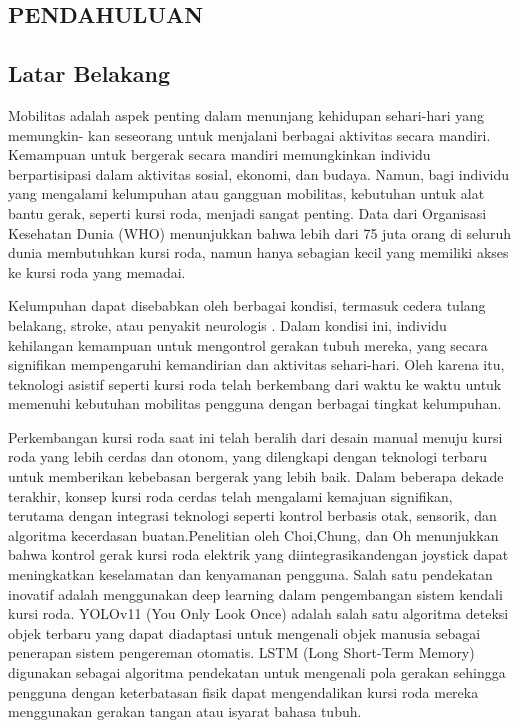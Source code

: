 
\begin{spacing}{1.2}
  \chapter{PENDAHULUAN}
\end{spacing}


\vspace{4ex}

\section{Latar Belakang}
Mobilitas adalah aspek penting dalam menunjang kehidupan sehari-hari yang memungkin-
kan seseorang untuk menjalani berbagai aktivitas secara mandiri. Kemampuan untuk bergerak secara mandiri memungkinkan individu berpartisipasi dalam aktivitas sosial, ekonomi, dan budaya. Namun, bagi individu yang mengalami kelumpuhan atau gangguan mobilitas, kebutuhan untuk alat bantu gerak, seperti kursi roda, menjadi sangat penting. Data dari Organisasi Kesehatan Dunia (WHO) menunjukkan bahwa lebih dari 75 juta orang di seluruh dunia membutuhkan kursi roda, namun hanya sebagian kecil yang memiliki akses ke kursi roda yang memadai\cite{WHO2018}. 

Kelumpuhan dapat disebabkan oleh berbagai kondisi, termasuk cedera tulang belakang, stroke, atau penyakit neurologis \cite{Nweke2018}. Dalam kondisi ini, individu kehilangan kemampuan untuk mengontrol gerakan tubuh mereka, yang secara signifikan mempengaruhi kemandirian dan aktivitas sehari-hari. Oleh karena itu, teknologi asistif seperti kursi roda telah berkembang dari waktu ke waktu untuk memenuhi kebutuhan mobilitas pengguna dengan berbagai tingkat kelumpuhan.

Perkembangan kursi roda saat ini telah beralih dari desain manual menuju kursi roda yang lebih cerdas dan otonom, yang dilengkapi dengan teknologi terbaru untuk memberikan kebebasan bergerak yang lebih baik\cite{Lang2019}. Dalam beberapa dekade terakhir, konsep kursi roda cerdas telah mengalami kemajuan signifikan, terutama dengan integrasi teknologi seperti kontrol berbasis otak, sensorik, dan algoritma kecerdasan buatan.Penelitian oleh Choi,Chung, dan Oh menunjukkan bahwa kontrol gerak kursi roda elektrik yang diintegrasikandengan joystick dapat meningkatkan keselamatan dan kenyamanan pengguna\cite{447c913241944300b8fc43999ab23048}. Salah satu pendekatan inovatif adalah menggunakan deep learning dalam pengembangan sistem kendali kursi roda. YOLOv11 (You Only Look Once) adalah salah satu algoritma deteksi objek terbaru yang dapat diadaptasi untuk mengenali objek manusia sebagai penerapan sistem pengereman otomatis. LSTM (Long Short-Term Memory) digunakan sebagai algoritma pendekatan untuk mengenali pola gerakan sehingga pengguna dengan keterbatasan fisik dapat mengendalikan kursi roda mereka menggunakan gerakan tangan atau isyarat bahasa tubuh\cite{KIM2021}.

